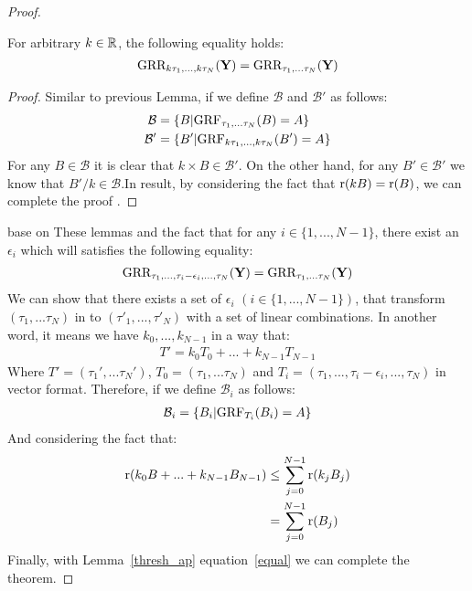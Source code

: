 \documentclass{article}
\newcommand{\R}{\ensuremath{\Real}}
\begin{document}
\begin{thm:thm}
\begin{proof}
\begin{thm:lemma}
For arbitrary $k \in \R$, the following equality holds: 
\begin{align}
\text{GRR}_{k\tau_{1},...,k\tau_{N}}(\mathbf{Y}) = \text{GRR}_{\tau_{1},...\tau_{N}}(\mathbf{Y})
\end{align}
\begin{proof}
Similar to previous Lemma, if we define $\mathcal{B}$ and $\mathcal{B}'$ as follows:
\begin{align}
\mathcal{B} &=\{B|\text{GRF}_{\tau_1,...\tau_N}(B)=A\}\\
\mathcal{B}' &=\{B'|\text{GRF}_{k\tau_1,...,k\tau_N}(B')=A\}
\end{align}
For any $B\in \mathcal{B}$  it is clear that  $k\times B\in \mathcal{B}'$. On the other hand, for any $B'\in \mathcal{B}'$  we know that  $ B'/k\in \mathcal{B}$.In result, by considering the fact that $\mathrm{r}(kB) = \mathrm{r}(B)$, we can complete the proof .
\end{proof}
\end{thm:lemma}

 base on These lemmas and the fact that for any $i \in \{1,...,N-1\}$, there exist an $\epsilon_i$ which will satisfies the following equality:
\begin{align}
\label{equal}
\text{GRR}_{\tau_{1},...,\tau_{i}-\epsilon_i,...,\tau_{N}}(\mathbf{Y}) = \text{GRR}_{\tau_{1},...\tau_{N}}(\mathbf{Y})
\end{align}
We can show that there exists a set of  $\epsilon_i$ $(i \in \{1,...,N-1\})$, that transform $(\tau_{1},...\tau_{N})$ in to $(\tau'_{1},...,\tau'_{N})$ with a set of linear combinations. In another word, it means we have $k_0,...,k_{N-1}$ in a way that:
\begin{align}
T'=k_0T_0+...+k_{N-1}T_{N-1}
\end{align}
Where $T'=(\tau_{1}',...\tau_{N}')$, $T_0=(\tau_{1},...\tau_{N})$ and $T_i=(\tau_{1},...,\tau_{i}-\epsilon_i,...,\tau_{N})$ in vector format. Therefore, if we define ${\mathcal{B}}_i$ as follows:
\begin{align}
{\mathcal{B}}_i=\{B_i|\text{GRF}_{T_i}(B_i)=A\}
\end{align}
And considering the fact that:
\begin{align}
 \mathrm{r}(k_0B+...+k_{N-1}B_{N-1})&\leq \sum_{j=0}^{N-1} \mathrm{r}(k_{j}B_{j})\\
  &=\sum_{j=0}^{N-1} \mathrm{r}(B_{j}) 
\end{align}
Finally, with Lemma~\ref{thresh_ap} equation~\ref{equal} we can complete the theorem.
\end{proof}
\end{thm:thm}
\end{document}
